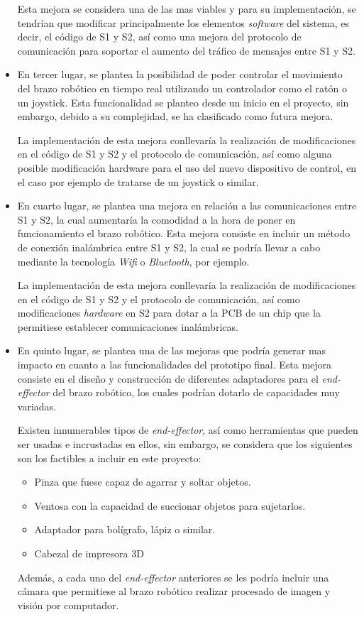 \begin{itemize}
    Esta mejora se considera una de las mas viables y para su implementación, se tendrían que modificar principalmente los elementos \textit{software} del sistema, es decir, el código de \ac{S1} y \ac{S2}, así como una mejora del protocolo de comunicación para soportar el aumento del tráfico de mensajes entre \ac{S1} y \ac{S2}.
    
    \item En tercer lugar, se plantea la posibilidad de poder controlar el movimiento del brazo robótico en tiempo real utilizando un controlador como el ratón o un joystick. Esta funcionalidad se planteo desde un inicio en el proyecto, sin embargo, debido a su complejidad, se ha clasificado como futura mejora.
    
    La implementación de esta mejora conllevaría la realización de modificaciones en el código de \ac{S1} y \ac{S2} y el protocolo de comunicación, así como alguna posible modificación hardware para el uso del nuevo dispositivo de control, en el caso por ejemplo de tratarse de un joystick o similar.
    
    \item En cuarto lugar, se plantea una mejora en relación a las comunicaciones entre \ac{S1} y \ac{S2}, la cual aumentaría la comodidad a la hora de poner en funcionamiento el brazo robótico. Esta mejora consiste en incluir un método de conexión inalámbrica entre \ac{S1} y \ac{S2}, la cual se podría llevar a cabo mediante la tecnología \textit{Wifi} o \textit{Bluetooth}, por ejemplo.
    
    La implementación de esta mejora conllevaría la realización de modificaciones en el código de \ac{S1} y \ac{S2} y el protocolo de comunicación, así como modificaciones \textit{hardware} en \ac{S2} para dotar a la PCB de un chip que la permitiese establecer comunicaciones inalámbricas.
    
    \item En quinto lugar, se plantea una de las mejoras que podría generar mas impacto en cuanto a las funcionalidades del prototipo final. Esta mejora consiste en el diseño y construcción de diferentes adaptadores para el \textit{end-effector} del brazo robótico, los cuales podrían dotarlo de capacidades muy variadas.
    
    Existen innumerables tipos de \textit{end-effector}, así como herramientas que pueden ser usadas e incrustadas en ellos, sin embargo, se considera que los siguientes son los factibles a incluir en este proyecto:
    \begin{itemize}
        \item Pinza que fuese capaz de agarrar y soltar objetos.
        \item Ventosa con la capacidad de succionar objetos para sujetarlos.
        \item Adaptador para bolígrafo, lápiz o similar.
        \item Cabezal de impresora 3D
    \end{itemize}
    Además, a cada uno del \textit{end-effector} anteriores se les podría incluir una cámara que permitiese al brazo robótico realizar procesado de imagen y visión por computador.
    

\end{itemize}
